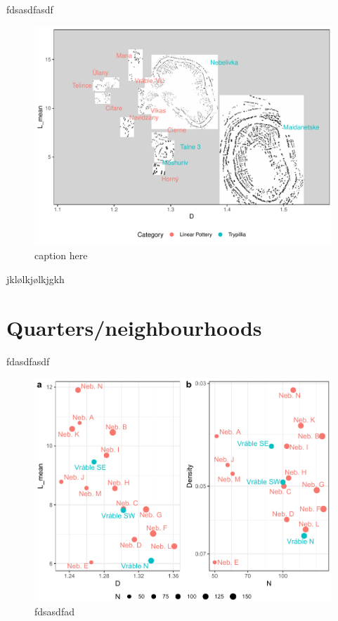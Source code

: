 \documentclass[
  12pt,
]{book}
\begin{document}
fdsasdfasdf

\begin{figure}
\hypertarget{fig09-settlements}{%
\centering
\includegraphics{Results/fig09_settlements.pdf}
\caption{caption here}\label{fig09-settlements}
}
\end{figure}

jklølkjølkjgkh

\hypertarget{quartersneighbourhoods-1}{%
\section{Quarters/neighbourhoods}\label{quartersneighbourhoods-1}}

fdasdfasdf



\begin{figure}

{\centering \includegraphics[width=0.9\linewidth]{bookdown-demo_files/figure-latex/09-quart-points-1} 

}

\caption{fdsasdfad}\label{fig:09-quart-points}
\end{figure}
\end{document}
